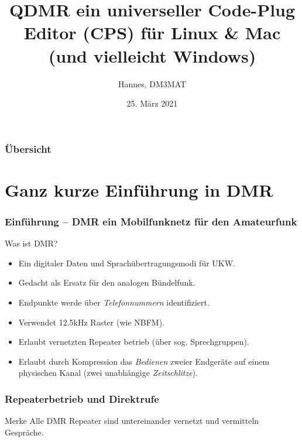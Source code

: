 \documentclass[aspectratio=169]{beamer}
\title[QDMR]{QDMR ein universeller Code-Plug Editor (CPS) für Linux \& Mac\\ (und vielleicht Windows)}
\subtitle{}
\author{Hannes, DM3MAT}
\institute{\texttt{dm3mat [at] darc [dot] de}}
\date{25. März 2021}
\begin{document}
\begin{frame}
 \titlepage
\end{frame}

\begin{frame} \frametitle{Übersicht}
 \tableofcontents
\end{frame}


\section{Ganz kurze Einführung in DMR}
\begin{frame} \frametitle{Einführung -- DMR ein Mobilfunknetz für den Amateurfunk} 
\begin{block}{Was ist DMR?}
 \begin{itemize}
  \item Ein digitaler Daten und Sprachübertragungsmodi für UKW.
  \item Gedacht als Ersatz für den analogen Bündelfunk.
  \item Endpunkte werde über \emph{Telefonnummern} identifiziert.
  \item Verwendet 12.5kHz Raster (wie NBFM). 
  \item Erlaubt vernetzten Repeater betrieb (über sog. Sprechgruppen).
  \item Erlaubt durch Kompression das \emph{Bedienen} zweier Endgeräte auf einem physischen Kanal (zwei unabhängige \emph{Zeitschlitze}).
 \end{itemize}
\end{block}
\end{frame}

\begin{frame} \frametitle{Repeaterbetrieb und Direktrufe}
 \begin{block}{Merke}
  Alle DMR Repeater sind untereinander vernetzt und vermitteln Gespräche.
 \end{block}
 \begin{center}
   
 \end{center}
\end{frame}
\end{document}
